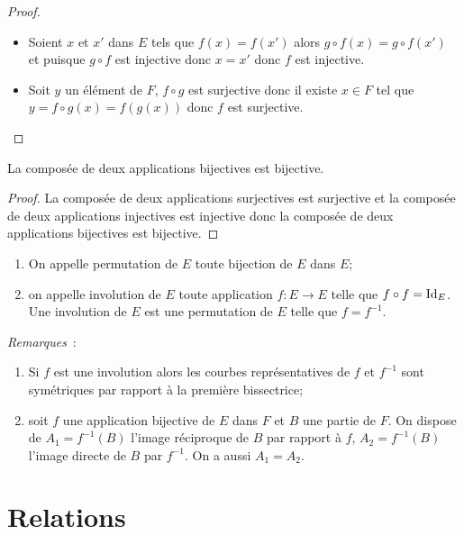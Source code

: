\begin{proof}
  \begin{itemize}
  \item Soient \(x\) et \(x'\) dans \(E\) tels que \(f(x)=f(x')\) alors \(g \circ f(x) = g \circ f(x')\) et puisque \(g \circ f\) est injective donc \(x=x'\) donc \(f\) est injective.
  \item Soit \(y\) un élément de \(F\), \(f \circ g\) est surjective donc il existe \(x \in F\) tel que \(y=f \circ g(x)=f(g(x))\) donc \(f\) est surjective.
  \end{itemize}
\end{proof}
%
\begin{prop}
La composée de deux applications bijectives est bijective.
\end{prop}
\begin{proof}
La composée de deux applications surjectives est surjective et la composée de deux applications injectives est injective donc la composée de deux applications bijectives est bijective.
\end{proof}
%
\begin{defdef}
\begin{enumerate}
\item On appelle permutation de \(E\) toute bijection de \(E\) dans \(E\);
\item on appelle involution de \(E\) toute application \(f: E \longrightarrow E\) telle que \(f \circ f=\operatorname{Id}_E\). Une involution de \(E\) est une permutation de \(E\) telle que \(f=f^{-1}\).
\end{enumerate}
\end{defdef}
%
\emph{Remarques}~:
\begin{enumerate}
\item Si \(f\) est une involution alors les courbes représentatives de \(f\) et \(f^{-1}\) sont symétriques par rapport à la première bissectrice;
\item soit \(f\) une application bijective de \(E\) dans \(F\) et \(B\) une partie de \(F\). On dispose de \(A_1=f^{-1}(B)\) l'image réciproque de \(B\) par rapport à \(f\), \(A_2=f^{-1}(B)\) l'image directe de \(B\) par \(f^{-1}\). On a aussi \(A_1=A_2\).
\end{enumerate}
%
\section{Relations}
\label{chap3-sec:relations}
